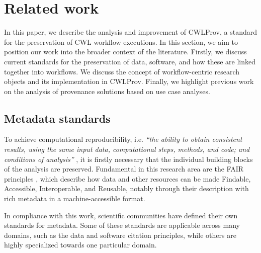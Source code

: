 \section{Related work}
\label{sec:renske:background}

In this paper, we describe the analysis and improvement of CWLProv, a standard for the preservation of CWL workflow executions. In this section, we aim to position our work into the broader context of the literature. Firstly, we discuss current standards for the preservation of data, software, and how these are linked together into workflows. We discuss the concept of workflow-centric research objects and its implementation in CWLProv. Finally, we highlight previous work on the analysis of provenance solutions based on use case analyses. 

\subsection{Metadata standards}
To achieve computational reproducibility, i.e. \emph{``the ability to obtain consistent results, using the same input data, computational steps, methods, and code; and conditions of analysis''} \cite{committeeonreproducibilityandreplicabilityinscienceReproducibilityReplicabilityScience2019}, it is firstly necessary that the individual building blocks of the analysis are preserved. Fundamental in this research area are the FAIR principles \cite{wilkinsonFAIRGuidingPrinciples2016}, which describe how data and other resources can be made Findable, Accessible, Interoperable, and Reusable, notably through their description with rich metadata in a machine-accessible format. 

In compliance with this work, scientific communities have defined their own standards for metadata. Some of these standards are applicable across many domains, such as the data \cite{datacitationsynthesisgroupJointDeclarationData2014} and software \cite{smithSoftwareCitationPrinciples2016} citation principles, while others are highly specialized towards one particular domain. 

